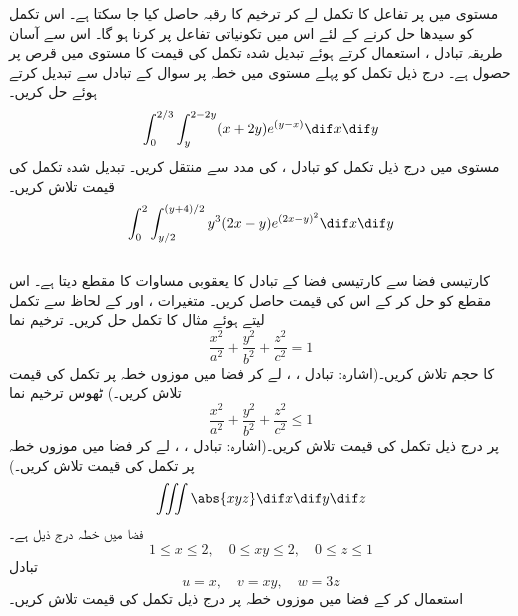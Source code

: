 مستوی  میں     پر تفاعل  کا تکمل لے کر ترخیم کا رقبہ  حاصل کیا جا سکتا ہے۔ اس تکمل کو سیدھا حل کرنے کے لئے اس میں تکونیاتی تفاعل  پر کرنا ہو گا۔ اس سے آسان طریقہ تبادل ،  استعمال کرتے ہوئے تبدیل شدہ تکمل کی    قیمت کا مستوی      میں  قرص  پر حصول ہے۔
درج ذیل تکمل کو پہلے مستوی   میں خطہ  پر سوال  کے تبادل سے تبدیل کرتے ہوئے  حل کریں۔
\[\int_0^{2/3}\int_y^{2-2y}(x+2y)e^{(y-x)}\dif x\dif y\]
مستوی  میں درج ذیل تکمل  کو تبادل ،  کی مدد سے منتقل کریں۔ تبدیل شدہ تکمل کی قیمت تلاش کریں۔
\[\int_0^2\int_{y/2}^{(y+4)/2}y^3(2x-y)e^{(2x-y)^2}\dif x\dif y\]
\\
کارتیسی  فضا  سے کارتیسی  فضا کے تبادل کا یعقوبی مساوات  کا مقطع  دیتا ہے۔ اس مقطع  کو حل کر کے اس کی قیمت  حاصل کریں۔
متغیرات ،  اور  کے لحاظ سے تکمل لیتے ہوئے مثال  کا تکمل حل کریں۔
ترخیم نما 
\[\frac{x^2}{a^2}+\frac{y^2}{b^2}+\frac{z^2}{c^2}=1\]
کا حجم تلاش کریں۔(اشارہ: تبادل ، ،   لے کر فضا  میں موزوں خطہ پر تکمل  کی قیمت تلاش کریں۔)
ٹھوس ترخیم نما 
\[\frac{x^2}{a^2}+\frac{y^2}{b^2}+\frac{z^2}{c^2}\le 1\]
پر درج ذیل تکمل کی قیمت تلاش کریں۔(اشارہ: تبادل ، ،  لے کر فضا  میں موزوں خطہ پر تکمل  کی قیمت تلاش کریں۔)
\[\iiint \abs{xyz}\dif x\dif y\dif z\]
فضا  میں  خطہ  درج           ذیل ہے۔
\[1\le x\le 2,\quad 0\le xy\le 2,\quad 0\le z\le 1\]
تبادل
\[u=x,\quad v=xy,\quad w=3z\]
استعمال کر کے فضا    میں موزوں خطہ   پر درج ذیل  تکمل کی قیمت تلاش کریں۔
